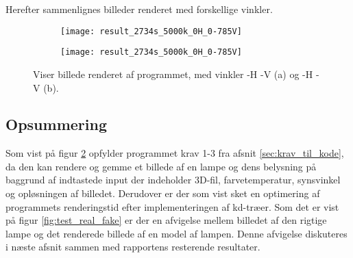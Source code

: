 Herefter sammenlignes billeder renderet med forskellige vinkler.
\begin{figure}[H]
\centering
\begin{subfigure}{.5\textwidth}
  \centering
  \texttt{[image: result\_2734s\_5000k\_0H\_0-785V]}
  \caption{}
  \label{fig:real}
\end{subfigure}%
\begin{subfigure}{.5\textwidth}
  \centering
  \texttt{[image: result\_2734s\_5000k\_0H\_0-785V]}
  \caption{}
  \label{fig:fake}
\end{subfigure}
\caption{Viser billede renderet af programmet, med vinkler -H -V (a) og -H -V (b).}
\label{fig:synsvinkel1}
\end{figure}

\subsection*{Opsummering}
Som vist på figur \ref{fig:fake} opfylder programmet krav 1-3 fra afsnit \ref{sec:krav_til_kode}, da den kan rendere og gemme et billede af en lampe og dens belysning på baggrund af indtastede input der indeholder 3D-fil, farvetemperatur, synsvinkel og opløsningen af billedet. Derudover er der som vist sket en optimering af programmets renderingstid efter implementeringen af kd-træer. 
Som det er vist på figur \ref{fig:test_real_fake} er der en afvigelse mellem billedet af den rigtige lampe og det renderede billede af en model af lampen. Denne afvigelse diskuteres i næste afsnit sammen med rapportens resterende resultater. 

